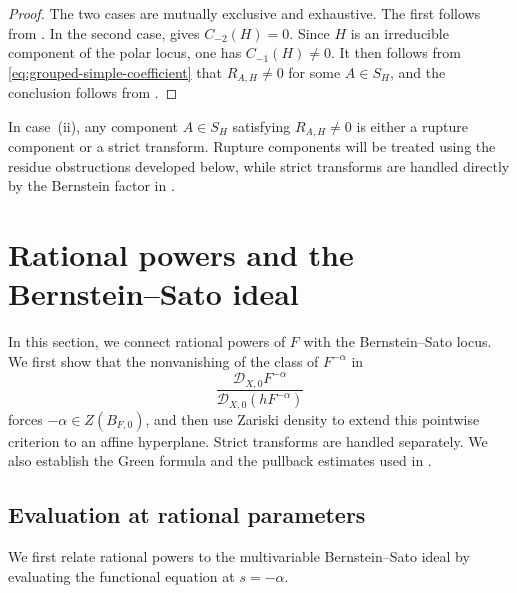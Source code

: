 \documentclass[12pt]{amsart}
\numberwithin{equation}{section}
\theoremstyle{plain}
\theoremstyle{definition}
\theoremstyle{remark}
\theoremstyle{definition}
\newcommand{\D}{\mathscr D}
\begin{document}
\begin{proof}
The two cases are mutually exclusive and exhaustive. The first follows from . In the second case,  gives $C_{-2}(H)=0$. Since $H$ is an irreducible component of the polar locus, one has $C_{-1}(H)\neq0$. It then follows from \eqref{eq:grouped-simple-coefficient} that $R_{A,H}\neq0$ for some $A\in S_H$, and the conclusion follows from .
\end{proof}

In case~\textup{(ii)}, any component $A\in S_H$ satisfying $R_{A,H}\neq0$ is either a rupture component or a strict transform. Rupture components will be treated using the residue obstructions developed below, while strict transforms are handled directly by the Bernstein factor in .





\section{Rational powers and the Bernstein--Sato ideal}\label{sec:cyclic-quotient}

In this section, we connect rational powers of $F$ with the Bernstein--Sato locus. We first show that the nonvanishing of the class of $F^{-\alpha}$ in
\begin{equation*}
    \frac{\D_{X,0}F^{-\alpha}}{\D_{X,0}(hF^{-\alpha})}
\end{equation*}
forces $-\alpha\in Z(B_{F,0})$, and then use Zariski density to extend this pointwise criterion to an affine hyperplane. Strict transforms are handled separately. We also establish the Green formula and the pullback estimates used in .

 


\subsection{Evaluation at rational parameters}

We first relate rational powers to the multivariable Bernstein--Sato ideal by evaluating the functional equation at $s=-\alpha$. 
\end{document}
